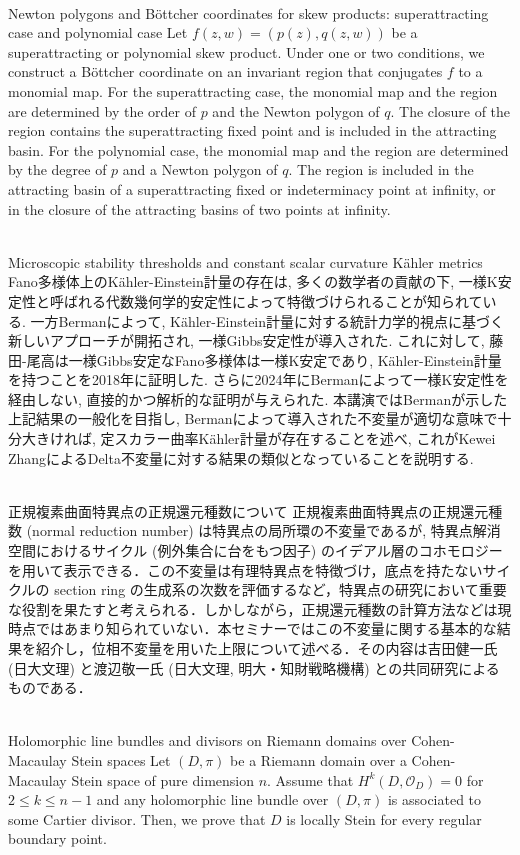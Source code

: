 \documentclass[dvipdfmx,a4paper,12pt]{article}
\theoremstyle{plain} %
\theoremstyle{definition} %
\begin{document}
\\
Newton polygons and B\"{o}ttcher coordinates for skew products: 
superattracting case and polynomial case
\vskip3mm
Let $f(z,w)=(p(z),q(z,w))$ be a superattracting or polynomial skew product. Under one or two conditions, we construct a B\"{o}ttcher coordinate on an invariant region that conjugates $f$ to a monomial map. For the superattracting case, the monomial map and the region are determined by the order of $p$ and the Newton polygon of $q$. The closure of the region contains the superattracting fixed point and is included in the attracting basin. For the polynomial case, the monomial map and the region are determined by the degree of $p$ and a Newton polygon of $q$. The region is included in the attracting basin of a superattracting fixed or indeterminacy point at infinity, or in the closure of the attracting basins of two points at infinity.
\vskip8mm

\newpage

\\
Microscopic stability thresholds and constant scalar curvature Kähler metrics
\vskip3mm
Fano多様体上のKähler-Einstein計量の存在は, 多くの数学者の貢献の下, 一様K安定性と呼ばれる代数幾何学的安定性によって特徴づけられることが知られている. 一方Bermanによって, Kähler-Einstein計量に対する統計力学的視点に基づく新しいアプローチが開拓され, 一様Gibbs安定性が導入された. これに対して, 藤田-尾高は一様Gibbs安定なFano多様体は一様K安定であり, Kähler-Einstein計量を持つことを2018年に証明した. さらに2024年にBermanによって一様K安定性を経由しない, 直接的かつ解析的な証明が与えられた. 本講演ではBermanが示した上記結果の一般化を目指し, Bermanによって導入された不変量が適切な意味で十分大きければ, 定スカラー曲率Kähler計量が存在することを述べ, これがKewei ZhangによるDelta不変量に対する結果の類似となっていることを説明する.
\vskip10mm

\vskip3mm
\\
正規複素曲面特異点の正規還元種数について
\vskip3mm
正規複素曲面特異点の正規還元種数 (normal reduction number) は特異点の局所環の不変量であるが, 特異点解消空間におけるサイクル (例外集合に台をもつ因子) のイデアル層のコホモロジーを用いて表示できる．この不変量は有理特異点を特徴づけ，底点を持たないサイクルの section ring の生成系の次数を評価するなど，特異点の研究において重要な役割を果たすと考えられる．しかしながら，正規還元種数の計算方法などは現時点ではあまり知られていない．本セミナーではこの不変量に関する基本的な結果を紹介し，位相不変量を用いた上限について述べる．その内容は吉田健一氏 (日大文理) と渡辺敬一氏 (日大文理, 明大・知財戦略機構) との共同研究によるものである．

\vskip8mm

\\
Holomorphic line bundles and divisors on Riemann domains over Cohen-Macaulay Stein spaces
\vskip3mm
Let $(D, \pi)$ be a Riemann domain over a Cohen-Macaulay Stein space of pure dimension $n$.
Assume that $H^k(D,\mathcal{O}_D) = 0$ for $2 \le k \le n - 1$ and any holomorphic line bundle over $(D,\pi)$ is associated to some Cartier divisor.
Then, we prove that $D$ is locally Stein for every regular boundary point.
\vskip8mm
\end{document}
